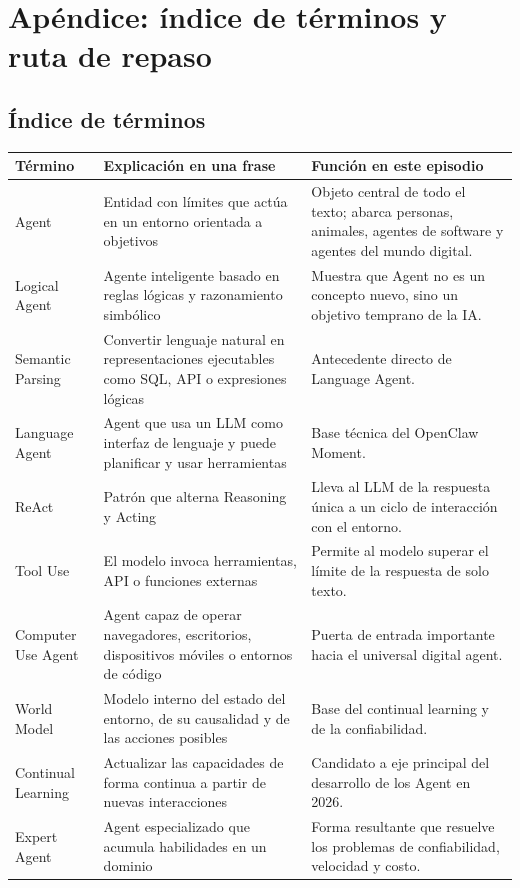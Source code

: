 \section{Apéndice: índice de términos y ruta de repaso}

\subsection{Índice de términos}

\begin{longtable}{p{}p{}p{}}
\toprule
Término & Explicación en una frase & Función en este episodio \\
\midrule
Agent & Entidad con límites que actúa en un entorno orientada a objetivos & Objeto central de todo el texto; abarca personas, animales, agentes de software y agentes del mundo digital. \\
Logical Agent & Agente inteligente basado en reglas lógicas y razonamiento simbólico & Muestra que Agent no es un concepto nuevo, sino un objetivo temprano de la IA. \\
Semantic Parsing & Convertir lenguaje natural en representaciones ejecutables como SQL, API o expresiones lógicas & Antecedente directo de Language Agent. \\
Language Agent & Agent que usa un LLM como interfaz de lenguaje y puede planificar y usar herramientas & Base técnica del OpenClaw Moment. \\
ReAct & Patrón que alterna Reasoning y Acting & Lleva al LLM de la respuesta única a un ciclo de interacción con el entorno. \\
Tool Use & El modelo invoca herramientas, API o funciones externas & Permite al modelo superar el límite de la respuesta de solo texto. \\
Computer Use Agent & Agent capaz de operar navegadores, escritorios, dispositivos móviles o entornos de código & Puerta de entrada importante hacia el universal digital agent. \\
World Model & Modelo interno del estado del entorno, de su causalidad y de las acciones posibles & Base del continual learning y de la confiabilidad. \\
Continual Learning & Actualizar las capacidades de forma continua a partir de nuevas interacciones & Candidato a eje principal del desarrollo de los Agent en 2026. \\
Expert Agent & Agent especializado que acumula habilidades en un dominio & Forma resultante que resuelve los problemas de confiabilidad, velocidad y costo. \\
\bottomrule
\end{longtable}

